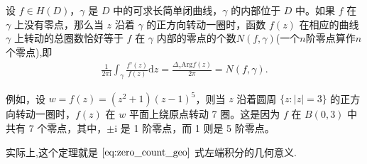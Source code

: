 \documentclass[../../main.tex]{subfiles}%
\begin{document}
\begin{theorem}[辐角原理]\label{theorem:辐角原理-定理4.4.2}
设 \( f \in H(D) \)，\( \gamma \) 是 \( D \) 中的可求长简单闭曲线，\( \gamma \) 的内部位于 \( D \) 中。如果 \( f \) 在 \( \gamma \) 上没有零点，那么当 \( z \) 沿着 \( \gamma \) 的正方向转动一圈时，函数 \( f(z) \) 在相应的曲线 \( \gamma \) 上转动的总圈数恰好等于 \( f \) 在 \( \gamma \) 内部的零点的个数$N(f,\gamma)$(一个$n$阶零点算作$n$个零点),即
\begin{align*}
\frac{1}{2\pi \mathrm{i}} \int_{\gamma} \frac{f'(z)}{f(z)} \mathrm{d}z = \frac{\Delta_{\gamma} \text{Arg} f(z)}{2\pi}   =N(f,\gamma). 
\end{align*}
\end{theorem}
\begin{remark}
例如，设 \(w= f(z) = (z^2 + 1)(z - 1)^5 \)，则当 \( z \) 沿着圆周 \( \{ z: |z| = 3 \} \) 的正方向转动一圈时，\( f(z) \) 在 \( w \) 平面上绕原点转动 7 圈。这是因为 \( f \) 在 \( B(0, 3) \) 中共有 7 个零点，其中，\( \pm \mathrm{i} \) 是 1 阶零点，而 1 则是 5 阶零点。
\end{remark}
\begin{remark}
实际上,这个定理就是 \(\eqref{eq:zero_count_geo}\) 式左端积分的几何意义.
\end{remark}
\end{document}
